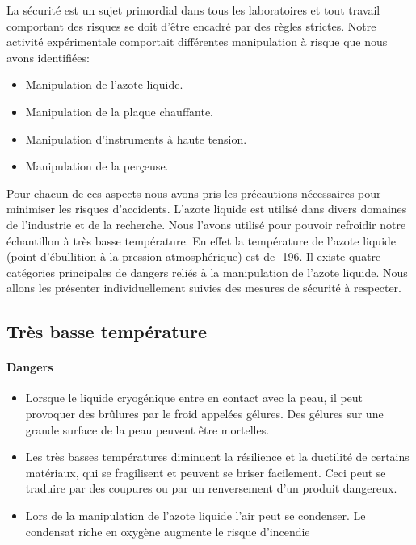 La sécurité est un sujet primordial dans tous les laboratoires et tout travail comportant des risques se doit d'être encadré par des règles strictes. Notre activité expérimentale comportait différentes manipulation à risque que nous avons identifiées:

\begin{itemize}
  \item Manipulation de l'azote liquide.
  \item Manipulation de la plaque chauffante.
  \item Manipulation d'instruments à haute tension.
  \item Manipulation de la perçeuse.
\end{itemize}

\bigskip
Pour chacun de ces aspects nous avons pris les précautions nécessaires pour minimiser les risques d'accidents. 
L'azote liquide est utilisé dans divers domaines de l'industrie et de la recherche. Nous l'avons utilisé pour pouvoir refroidir notre échantillon à très basse température. En effet la température de l’azote liquide (point d’ébullition à la pression atmosphérique) est de -196\celsius{}. 
Il existe quatre catégories principales de dangers reliés à la manipulation de l'azote liquide. Nous allons les présenter individuellement suivies des mesures de sécurité à respecter.

\subsection{Très basse température}

\paragraph{Dangers}

\begin{itemize}
  \item Lorsque le liquide cryogénique entre en contact avec la peau, il peut provoquer des 
brûlures par le froid appelées gélures. Des gélures sur une grande surface de la peau peuvent être mortelles. 
  \item Les très basses températures diminuent la résilience et la ductilité de certains 
matériaux, qui se fragilisent et peuvent se briser facilement. Ceci peut se traduire par des coupures ou par un renversement d'un produit dangereux.
  \item Lors de la manipulation de l'azote liquide l’air peut se condenser. Le condensat riche en oxygène augmente le risque d'incendie 
\end{itemize}

